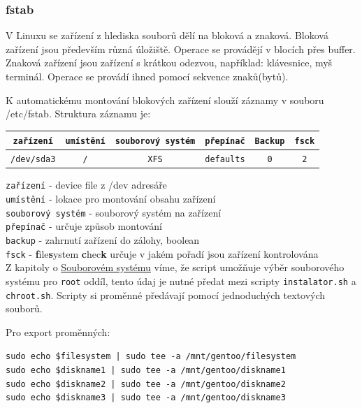 \documentclass[12pt,a4paper,twoside,]{article}
\begin{document}
\subsubsection{fstab}
V Linuxu se zařízení z hlediska souborů dělí na bloková a znaková. Bloková zařízení jsou především různá úložiště. Operace se provádějí v blocích přes buffer. Znaková zařízení jsou zařízení s krátkou odezvou, například: klávesnice, myš terminál. Operace se provádí ihned pomocí sekvence znaků(bytů).

K automatickému montování blokových zařízení slouží záznamy v souboru /etc/fstab. Struktura záznamu je:

\begin{table}[h]
	\begin{tabular}{|c|c|c|c|c|c|}
		\hline
		\texttt{zařízení} & \texttt{umístění} & \texttt{souborový systém} & \texttt{přepínač} & \texttt{Backup} & \texttt{fsck} \\
		\hline
		\texttt{/dev/sda3} & \texttt{/} & \texttt{XFS} & \texttt{defaults} & \texttt{0} & \texttt{2} \\
		\hline
		
	\end{tabular}
\end{table}
\hspace*{-1.5em}\texttt{zařízení} - device file z /dev adresáře\\
\texttt{umístění} - lokace pro montování obsahu zařízení \\
\texttt{souborový systém} - souborový systém na zařízení\\
\texttt{přepínač} - určuje způsob montování\\
\texttt{backup} - zahrnutí zařízení do zálohy, boolean\\
\texttt{fsck} - {\bf f}ile{\bf s}ystem {\bf c}hec{\bf k} určuje v jakém pořadí jsou zařízení kontrolována\\

Z kapitoly o \hyperlink{Souborový systém}{Souborovém systému} víme, že script umožňuje výběr souborového systému pro \texttt{root} oddíl, tento údaj je nutné předat mezi scripty \texttt{instalator.sh} a \texttt{chroot.sh}. Scripty si proměnné předávají pomocí jednoduchých textových souborů.

\hspace*{-1.5em}Pro export proměnných:

\texttt{sudo echo \$filesystem | sudo tee -a /mnt/gentoo/filesystem} \\
\hspace*{1.5em}\texttt{sudo echo \$diskname1 | sudo tee -a /mnt/gentoo/diskname1} \\
\hspace*{1.5em}\texttt{sudo echo \$diskname2 | sudo tee -a /mnt/gentoo/diskname2} \\
\hspace*{1.5em}\texttt{sudo echo \$diskname3 | sudo tee -a /mnt/gentoo/diskname3} \\
\end{document}
